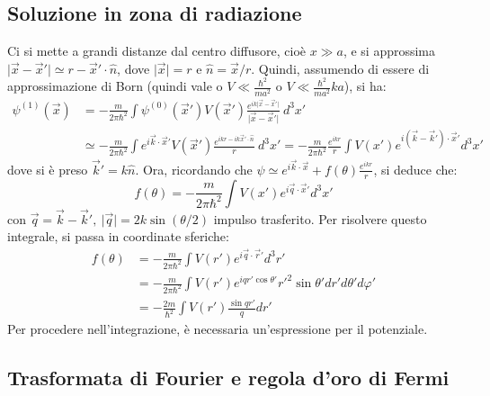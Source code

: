\documentclass[11pt, a4paper]{scrartcl} %
\numberwithin{equation}{subsection}
\theoremstyle{style2}
\theoremstyle{style1}
\begin{document}
\subsection{Soluzione in zona di radiazione}
Ci si mette a grandi distanze dal centro diffusore, cio\`e $x \gg a$, e si approssima $\lvert \vec{x}- \vec{x}' \rvert \simeq r - \vec{x}' \cdot \hat{n}$, dove $\lvert \vec{x} \rvert = r$ e $\hat{n} = \vec{x} / r$.
Quindi, assumendo di essere di approssimazione di Born (quindi vale o $V \ll \frac{\hbar ^2}{ma^2}$ o $V \ll \frac{\hbar ^2}{ma^2}ka$), si ha:
\[
\begin{split}
	\psi ^{(1)} (\vec{x}) &= -\frac{m}{2\pi \hbar ^2}\int \psi ^{(0)} (\vec{x}') V(\vec{x}') \frac{e^{ik\lvert \vec{x}- \vec{x}' \rvert }}{\lvert \vec{x}-\vec{x}' \rvert } \ d^3 x'\\
	& \simeq - \frac{m}{2\pi \hbar ^2} \int e^{i \vec{k}\cdot \vec{x}'} V(\vec{x}') \frac{e^{ikr - ik \vec{x}' \cdot \hat{n}} }{r} \ d^3 x' = - \frac{m}{2\pi \hbar ^2} \frac{e^{ikr} }{r} \int V (x') e^{i(\vec{k}-\vec{k}') \cdot \vec{x}'}  d^3 x'
\end{split}
\] 
dove si \`e preso $\vec{k}' = k \hat{n}$.
Ora, ricordando che $\psi \simeq e^{i \vec{k}\cdot \vec{x}} + f(\theta ) \frac{e^{ikr} }{r}$, si deduce che:
\begin{equation*}
	f(\theta ) = - \frac{m}{2\pi \hbar ^2}\int V(x') e^{i \vec{q}\cdot \vec{x}'}  d^3 x'
\end{equation*}
con $\vec{q} = \vec{k} - \vec{k}', \ \lvert \vec{q} \rvert = 2k \sin (\theta / 2)$ impulso trasferito.
Per risolvere questo integrale, si passa in coordinate sferiche:
\begin{equation}
	\begin{split}
		f(\theta ) &=- \frac{m}{2\pi \hbar ^2} \int V(r') e^{i \vec{q}\cdot \vec{r}'} d^3 r'\\
			   &= - \frac{m}{2\pi \hbar ^2}\int V(r') e^{iq r' \cos \theta '} r'^2 \sin \theta ' dr' d\theta ' d \varphi '\\
			   &= - \frac{2m}{\hbar ^2} \int V(r') \frac{\sin qr'}{q} dr'
	\end{split}
\end{equation}
Per procedere nell'integrazione, \`e necessaria un'espressione per il potenziale.
\subsection{Trasformata di Fourier e regola d'oro di Fermi}
\end{document}
